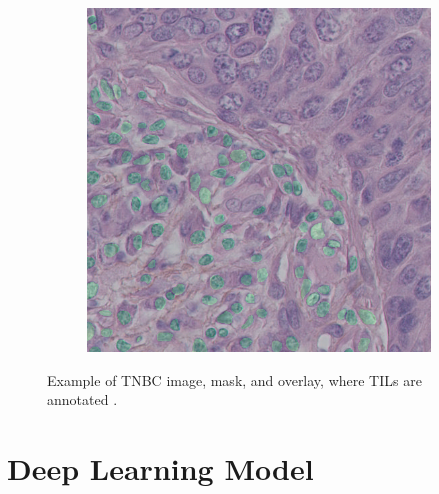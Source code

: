 \begin{figure}[H]
\begin{subfigure}[b]{0.32\textwidth}
    \label{fig:tcga-mask}
  \end{subfigure}%
  \hfill
  \begin{subfigure}[b]{0.32\textwidth}
    \centering
    \includegraphics[width=\linewidth]{assets/images/for_presentation/overlay_10_1.png}
    \label{fig:tcga-overlay}
  \end{subfigure}%
  \caption{Example of TNBC image, mask, and overlay, where TILs are annotated \cite{TNBC-nuclei-seg-extended}.}
  \label{fig:tcga-with-without}
\end{figure}

\section{Deep Learning Model}
\label{section:dl-model}

